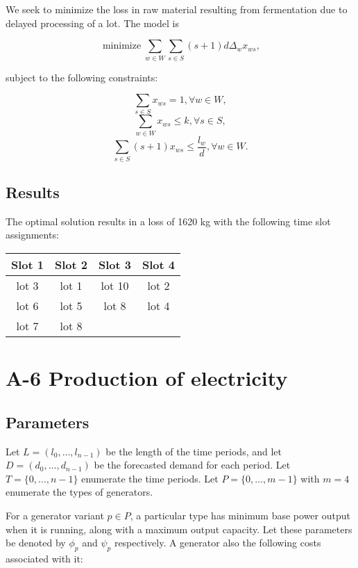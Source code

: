 \documentclass[11pt,oneside]{article}
\DeclareMathOperator*{\minimize}{minimize}
\begin{document}
We seek to minimize the loss in raw material resulting from fermentation due
to delayed processing of a lot. The model is

$$
\minimize \sum_{w\in W}\sum_{s\in S} (s+1)d \Delta_w x_{ws},
$$

subject to the following constraints:

$$
\sum_{s\in S} x_{ws} = 1, \forall w \in W,
$$
$$
\sum_{w\in W} x_{ws} \leq k, \forall s \in S,
$$
$$
\sum_{s\in S} (s+1)x_{ws} \leq \frac{l_w}{d}, \forall w \in W.
$$

\subsection{Results}

The optimal solution results in a loss of 1620 kg with the following
time slot assignments:

\begin{table}[h]
    \center
    \begin{tabular}{cccc}
        \hline
        \textbf{Slot 1} & \textbf{Slot 2} & \textbf{Slot 3} & \textbf{Slot 4} \\
        \hline
        lot 3   & lot 1 & lot 10 & lot 2 \\
        lot 6   & lot 5 & lot 8 & lot 4 \\
        lot 7   & lot 8 \\

    \end{tabular}
\end{table}

\section{A-6 Production of electricity}

\subsection{Parameters}

Let $L=\left(l_0, \ldots, l_{n-1}\right)$ be the length of the time periods, and
let $D=\left(d_0, \ldots, d_{n-1}\right)$ be the forecasted demand for each
period. Let $T = \lbrace 0, \ldots, n-1\rbrace$ enumerate the time periods.
Let $P=\lbrace 0, \ldots, m-1\rbrace$ with $m=4$ enumerate the types of generators.

For a generator variant $p\in P$, a particular type has minimum base power output
when it is running, along with a maximum output capacity. Let these parameters
be denoted by $\phi_p$ and $\psi_p$ respectively. A generator also the following costs
associated with it:
\end{document}
